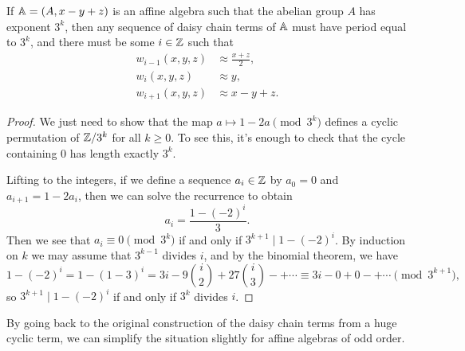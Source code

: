 \documentclass[letterpaper,11pt]{article}
\begin{document}
\begin{prop} If $\mathbb{A} = (A,x-y+z)$ is an affine algebra such that the abelian group $A$ has exponent $3^k$, then any sequence of daisy chain terms of $\mathbb{A}$ must have period equal to $3^k$, and there must be some $i \in \mathbb{Z}$ such that
\begin{align*}
w_{i-1}(x,y,z) &\approx \frac{x+z}{2},\\
w_i(x,y,z) &\approx y,\\
w_{i+1}(x,y,z) &\approx x-y+z.
\end{align*}
\end{prop}
\begin{proof} We just need to show that the map $a \mapsto 1-2a \pmod{3^k}$ defines a cyclic permutation of $\mathbb{Z}/3^k$ for all $k \ge 0$. To see this, it's enough to check that the cycle containing $0$ has length exactly $3^k$.

Lifting to the integers, if we define a sequence $a_i \in \mathbb{Z}$ by $a_0 = 0$ and $a_{i+1} = 1-2a_i$, then we can solve the recurrence to obtain
\[
a_i = \frac{1 - (-2)^i}{3}.
\]
Then we see that $a_i \equiv 0 \pmod{3^k}$ if and only if $3^{k+1} \mid 1 - (-2)^i$. By induction on $k$ we may assume that $3^{k-1}$ divides $i$, and by the binomial theorem, we have
\[
1 - (-2)^i = 1 - (1-3)^i = 3i - 9\binom{i}{2} + 27\binom{i}{3} -+ \cdots \equiv 3i - 0 + 0 -+ \cdots \pmod{3^{k+1}},
\]
so $3^{k+1} \mid 1 - (-2)^i$ if and only if $3^k$ divides $i$.
\end{proof}

By going back to the original construction of the daisy chain terms from a huge cyclic term, we can simplify the situation slightly for affine algebras of odd order.
\end{document}
